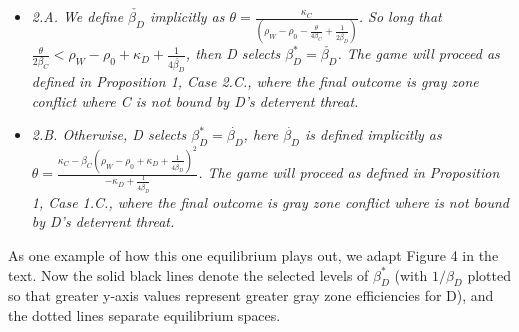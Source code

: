 \documentclass[
]{article}
\begin{document}
\begin{itemize}
  \item \textit{2.A. We define $\check{\beta_{D}}$ implicitly as $\theta=\frac{\kappa_{C}}{\left(\rho_{W}-\rho_{0}-\frac{\theta}{4\beta_{C}}+\frac{1}{2\check{\beta_{D}}}\right)}$. So long that $\frac{\theta}{2\beta_{C}}<\rho_{W}-\rho_{0}+\kappa_{D}+\frac{1}{4\check{\beta_{D}}}$, then D selects $\beta_{D}^{*}=\check{\beta_{D}}$. The game will proceed as defined in Proposition 1, Case 2.C., where the final outcome is gray zone conflict where C is not bound by D's deterrent threat.} 
  \item \textit{2.B. Otherwise, D selects $\beta_{D}^{*}=\dot{\beta_{D}}$, here $\dot{\beta_{D}}$ is defined implicitly as $\theta=\frac{\kappa_{C}-\beta_{C}\left(\rho_{W}-\rho_{0}+\kappa_{D}+\frac{1}{4\dot{\beta_{D}}}\right)^{2}}{-\kappa_{D}+\frac{1}{4\dot{\beta_{D}}}}$. The game will proceed as defined in Proposition 1, Case 1.C., where the final outcome is gray zone conflict where is not bound by D's deterrent threat.} 
  \end{itemize}

As one example of how this one equilibrium plays out, we adapt Figure 4 in the text. Now the solid black lines denote the selected levels of \(\beta_{D}^{*}\) (with \(1/\beta_{D}\) plotted so that greater y-axis values represent greater gray zone efficiencies for D), and the dotted lines separate equilibrium spaces.
\end{document}
